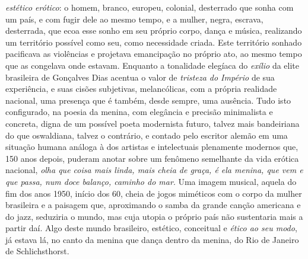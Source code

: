 \emph{estético erótico}: o homem, branco, europeu, colonial, desterrado
que sonha com um país, e com fugir dele ao mesmo tempo, e a mulher,
negra, escrava, desterrada, que ecoa esse sonho em seu próprio corpo,
dança e música, realizando um território possível como seu, como
necessidade criada. Este território sonhado pacificava as violências e
projetava emancipação no próprio ato, ao mesmo tempo que as congelava
onde estavam. Enquanto a tonalidade elegíaca do \emph{exílio} da elite
brasileira de Gonçalves Dias acentua o valor de \emph{tristeza do
Império} de sua experiência, e suas cisões subjetivas, melancólicas, com
a própria realidade nacional, uma presença que é também, desde sempre,
uma ausência. Tudo isto configurado, na poesia da menina, com elegância
e precisão minimalista e concreta, digna de um possível poeta modernista
futuro, talvez mais bandeiriana do que oswaldiana, talvez o contrário, e
contado pelo escritor alemão em uma situação humana análoga à dos
artistas e intelectuais plenamente modernos que, 150 anos depois,
puderam anotar sobre um fenômeno semelhante da vida erótica nacional,
\emph{olha que coisa mais linda, mais cheia de graça, é ela menina, que
vem e que passa, num doce balanço, caminho do mar}. Uma imagem musical,
aquela do fim dos anos 1950, início dos 60, cheia de jogos miméticos com
o corpo da mulher brasileira e a paisagem que, aproximando o samba da
grande canção americana e do jazz, seduziria o mundo, mas cuja utopia o
próprio país não sustentaria mais a partir daí. Algo deste mundo
brasileiro, estético, conceitual e \emph{ético ao seu modo}, já estava
lá, no canto da menina que dança dentro da menina, do Rio de Janeiro de
Schlichsthorst.

